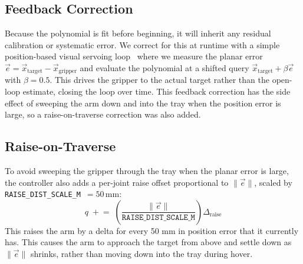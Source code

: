\subsection{Feedback Correction}
Because the polynomial is fit before beginning, it will inherit any residual calibration or systematic error. We correct for this at runtime with a simple position-based visual servoing
loop~\cite{chaumette2006visual1} where we measure the planar error $\vec{e} = \vec{x}_{\text{target}} - \vec{x}_{\text{gripper}}$ and evaluate the polynomial at a shifted query $\vec{x}_{\text{target}} + \beta\vec{e}$ with $\beta=0.5$. This drives the gripper to the actual target rather than the open-loop estimate, closing the loop over time. This feedback correction has the side effect of sweeping the arm down and into the tray when the position error is large, so a raise-on-traverse correction was also added.

\subsection{Raise-on-Traverse}
To avoid sweeping the gripper through the tray when the planar error is large, the controller also adds a per-joint raise offset
proportional to $\|\vec{e}\|$, scaled by
\texttt{RAISE\_DIST\_SCALE\_M}~$=50$\,mm:
\begin{equation}
  q \;\mathrel{+}=\;
  \left(\frac{\|\vec{e}\|}{\texttt{RAISE\_DIST\_SCALE\_M}}\right)
  \Delta_{\text{raise}}
\end{equation}
This raises the arm by a delta for every 50 mm in position error that it currently has. This causes the arm to approach the target from above and settle down as $\|\vec{e}\|$ shrinks, rather than moving down into the tray during hover.
